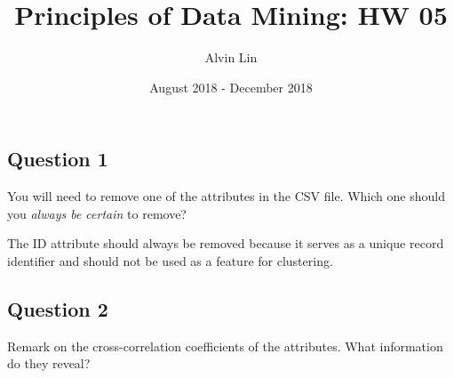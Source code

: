 \documentclass{math}
\title{Principles of Data Mining: HW 05}
\author{Alvin Lin}
\date{August 2018 - December 2018}
\begin{document}
\maketitle

\subsection*{Question 1}
You will need to remove one of the attributes in the CSV file. Which one should
you \textit{always be certain} to remove? \par
The ID attribute should always be removed because it serves as a unique record
identifier and should not be used as a feature for clustering.

\subsection*{Question 2}
Remark on the cross-correlation coefficients of the attributes. What information
do they reveal? \par
\end{document}
